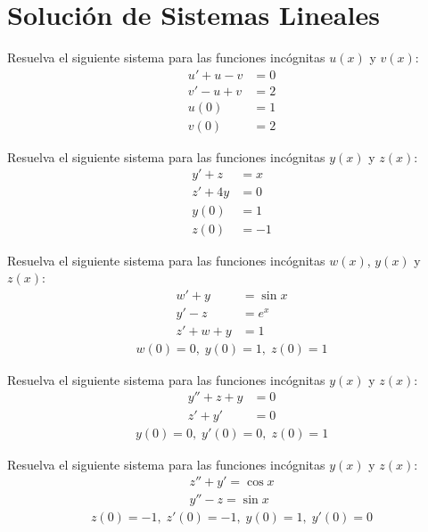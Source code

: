 \section{Solución de Sistemas Lineales}


Resuelva el siguiente sistema para las funciones incógnitas $u(x)$ y $v(x)$:
\begin{align*}
u'+u-v &=0\\
v'-u+v &= 2 \\
u(0)&=1\\
v(0)&=2
\end{align*}



Resuelva el siguiente sistema para las funciones incógnitas $y(x)$ y $z(x)$:
\begin{align*}
y'+z&=x\\
z'+4y &= 0 \\
y(0)&=1\\
z(0)&=-1
\end{align*}




Resuelva el siguiente sistema para las funciones incógnitas $w(x)$, $y(x)$ y $z(x)$:
\begin{align*}
w'+y&=\sin x\\
y'-z &= e^x\\
z'+w+y&=1 
\end{align*}
\begin{align*}
w(0)=0,\; y(0)=1, \; z(0)=1
\end{align*}



Resuelva el siguiente sistema para las funciones incógnitas $y(x)$ y $z(x)$:
\begin{align*}
y''+z+y&=0\\
z'+y'&=0 
\end{align*}
\begin{align*}
y(0)=0,\;
y'(0)=0,\;
z(0)=1
\end{align*}




Resuelva el siguiente sistema para las funciones incógnitas $y(x)$ y $z(x)$:
\begin{align*}
z''+y'=\cos x\\
y''-z=\sin x 
\end{align*}
\begin{align*}
z(0)=-1,\;
z'(0)=-1,\;
y(0)=1,\;
y'(0)=0
\end{align*}


